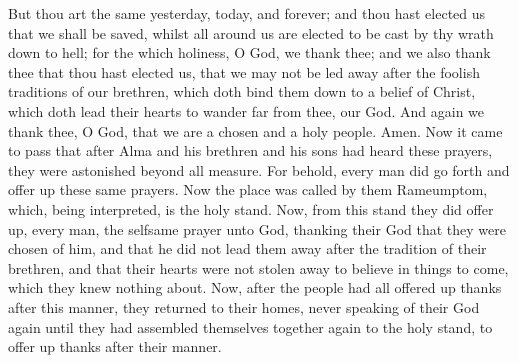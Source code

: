 But thou art the same yesterday, today, and forever; and thou hast elected us that we shall be saved, whilst all around us are elected to be cast by thy wrath down to hell; for the which holiness, O God, we thank thee; and we also thank thee that thou hast elected us, that we may not be led away after the foolish traditions of our brethren, which doth bind them down to a belief of Christ, which doth lead their hearts to wander far from thee, our God.
\bverse \iffalse And again we thank thee, O God, that we are a chosen and a holy people. Amen. \fi
And again we thank thee, O God, that we are a chosen and a holy people. Amen.
\bverse \iffalse Now it came to pass that after Alma and his brethren and his sons had heard these prayers, they were astonished beyond all measure. \fi
Now it came to pass that after Alma and his brethren and his sons had heard these prayers, they were astonished beyond all measure.
\bverse \iffalse For behold, every man did go forth and offer up these same prayers. \fi
For behold, every man did go forth and offer up these same prayers.
\bverse \iffalse Now the place was called by them Rameumptom, which, being interpreted, is the holy stand. \fi
Now the place was called by them Rameumptom, which, being interpreted, is the holy stand.
\bverse \iffalse Now, from this stand they did offer up, every man, the selfsame prayer unto God, thanking their God that they were chosen of him, and that he did not lead them away after the tradition of their brethren, and that their hearts were not stolen away to believe in things to come, which they knew nothing about. \fi
Now, from this stand they did offer up, every man, the selfsame prayer unto God, thanking their God that they were chosen of him, and that he did not lead them away after the tradition of their brethren, and that their hearts were not stolen away to believe in things to come, which they knew nothing about.
\bverse \iffalse Now, after the people had all offered up thanks after this manner, they returned to their homes, never speaking of their God again until they had assembled themselves together again to the holy stand, to offer up thanks after their manner. \fi
Now, after the people had all offered up thanks after this manner, they returned to their homes, never speaking of their God again until they had assembled themselves together again to the holy stand, to offer up thanks after their manner.
\bverse \iffalse Now when Alma saw this his heart was grieved; for he saw that they were a wicked and a perverse people; yea, he saw that their hearts were set upon gold, and upon silver, and upon all manner of fine goods. \fi
